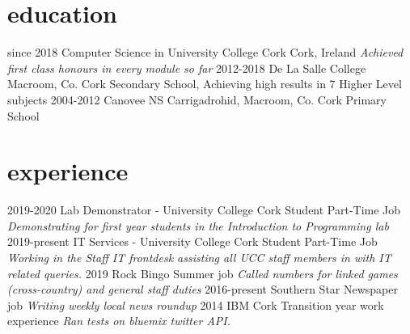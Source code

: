 \documentclass[]{friggeri-cv}
\begin{document}
\section{education}

\begin{entrylist}
  \entry
    {since 2018}
    {Computer Science in {\normalfont University College Cork}}
    {Cork, Ireland}
    {\emph{Achieved first class honours in every module so far}}
  \entry
    {2012-2018}
    {De La Salle College}
    {Macroom, Co. Cork}
    {Secondary School, Achieving high results in 7 Higher Level subjects}
  \entry
    {2004-2012}
    {Canovee NS}
    {Carrigadrohid, Macroom, Co. Cork}
    {Primary School}
\end{entrylist}

\section{experience}

\begin{entrylist}
  \entry
    {2019-2020}
    {Lab Demonstrator - {\normalfont University College Cork}}
    {Student Part-Time Job}
    {\emph{Demonstrating for first year students in the \textit{Introduction to Programming} lab}}
  \entry
    {2019-present}
    {IT Services - {\normalfont University College Cork}}
    {Student Part-Time Job}
    {\emph{Working in the Staff IT frontdesk assisting all UCC staff members in with IT related queries.}}
  \entry
    {2019}
    {Rock Bingo}
    {Summer job}
    {\emph{Called numbers for linked games (cross-country) and general staff duties}}
  \entry
    {2016-present}
    {Southern Star}
    {Newspaper job}
    {\emph{Writing weekly local news roundup}}
  \entry
    {2014}
    {IBM Cork}
    {Transition year work experience}
    {\emph{Ran tests on bluemix twitter API.}}
\end{entrylist}



% 
\end{document}

